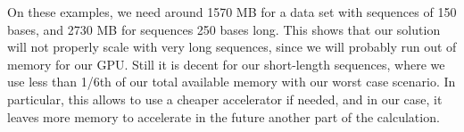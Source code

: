 On these examples, we need around 1570 MB for a data set with sequences of 150 bases, and 2730 MB for sequences 250 bases long. This shows that our solution will not properly scale with very long sequences, since we will probably run out of memory for our GPU. Still it is decent for our short-length sequences, where we use less than 1/6th of our total available memory with our worst case scenario. In particular, this allows to use a cheaper accelerator if needed, and in our case, it leaves more memory to accelerate in the future another part of the calculation.
